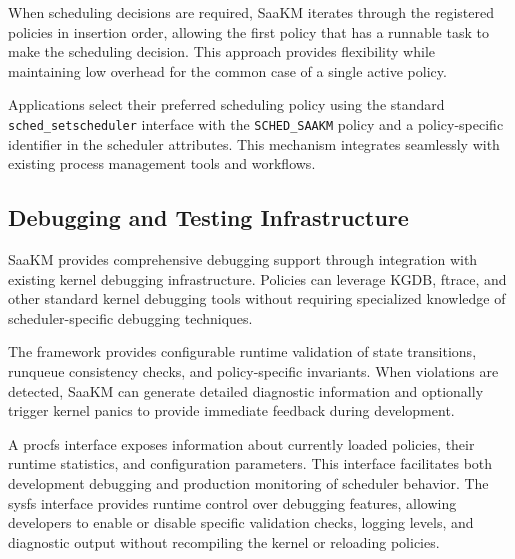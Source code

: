 \parspace
When scheduling decisions are required, SaaKM iterates through the registered policies in insertion order, allowing the first policy that has a runnable task to make the scheduling decision. This approach provides flexibility while maintaining low overhead for the common case of a single active policy.

\parspace
Applications select their preferred scheduling policy using the standard \texttt{sched\_setscheduler} interface with the \texttt{SCHED\_SAAKM} policy and a policy-specific identifier in the scheduler attributes. This mechanism integrates seamlessly with existing process management tools and workflows.

\subsection{Debugging and Testing Infrastructure}

SaaKM provides comprehensive debugging support through integration with existing kernel debugging infrastructure. Policies can leverage KGDB\cite{kgdb}, ftrace, and other standard kernel debugging tools without requiring specialized knowledge of scheduler-specific debugging techniques.

\parspace
The framework provides configurable runtime validation of state transitions, runqueue consistency checks, and policy-specific invariants. When violations are detected, SaaKM can generate detailed diagnostic information and optionally trigger kernel panics to provide immediate feedback during development.

\parspace
A procfs interface exposes information about currently loaded policies, their runtime statistics, and configuration parameters. This interface facilitates both development debugging and production monitoring of scheduler behavior. The sysfs interface provides runtime control over debugging features, allowing developers to enable or disable specific validation checks, logging levels, and diagnostic output without recompiling the kernel or reloading policies.